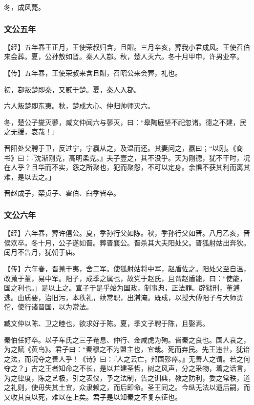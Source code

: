 \documentclass[]{article}
\begin{document}
冬，成风薨。

\hypertarget{header-n1100}{%
\subsubsection{文公五年}\label{header-n1100}}

【经】五年春王正月，王使荣叔归含，且賵。三月辛亥，葬我小君成风。王使召伯来会葬。夏，公孙敖如晋。秦人入鄀。秋，楚人灭六。冬十月甲申，许男业卒。

【传】五年春，王使荣叔来含且賵，召昭公来会葬，礼也。

初，鄀叛楚即秦，又贰于楚。夏，秦人入鄀。

六人叛楚即东夷。秋，楚成大心、仲归帅师灭六。

冬，楚公子燮灭蓼，臧文仲闻六与蓼灭，曰：``皋陶庭坚不祀忽诸。德之不建，民之无援，哀哉！」

晋阳处父聘于卫，反过宁，宁嬴从之，及温而还。其妻问之，嬴曰；``以刚。《商书》曰：『沈渐刚克，高明柔克。』夫子壹之，其不没乎。天为刚德，犹不干时，况在人乎？且华而不实，怨之所聚也，犯而聚怨，不可以定身。余惧不获其利而离其难，是以去之。」

晋赵成子，栾贞子、霍伯、臼季皆卒。

\hypertarget{header-n1110}{%
\subsubsection{文公六年}\label{header-n1110}}

【经】六年春，葬许僖公。夏，季孙行父如陈。秋，季孙行父如晋。八月乙亥，晋侯欢卒。冬十月，公子遂如晋。葬晋襄公。晋杀其大夫阳处父。晋狐射姑出奔狄。闰月不告月，犹朝于庙。

【传】六年春，晋蒐于夷，舍二军。使狐射姑将中军，赵盾佐之。阳处父至自温，改蒐于董，易中军。阳子，成季之属也，故党于赵氏，且谓赵盾能，曰：``使能，国之利也。」是以上之。宣子于是乎始为国政，制事典，正法罪。辟狱刑，董逋逃。由质要，治旧污，本秩礼，续常职，出滞淹。既成，以授大傅阳子与大师贾佗，使行诸晋国，以为常法。

臧文仲以陈、卫之睦也，欲求好于陈。夏，季文子聘于陈，且娶焉。

秦伯任好卒。以子车氏之三子奄息、仲行、金咸虎为殉。皆秦之良也。国人哀之，为之赋《黄鸟》。君子曰：``秦穆之不为盟主也，宜哉。死而弃民。先王违世，犹诒之法，而况夺之善人乎！《诗》曰：『人之云亡，邦国殄瘁。』无善人之谓。若之何夺之？」古之王者知命之不长，是以并建圣哲，树之风声，分之采物，着之话言，为之律度，陈之艺极，引之表仪，予之法制，告之训典，教之防利，委之常秩，道之礼则，使毋失其土宜，众隶赖之，而后即命。圣王同之。今纵无法以遗后嗣，而又收其良以死，难以在上矣。君子是以知秦之不复东征也。
\end{document}
